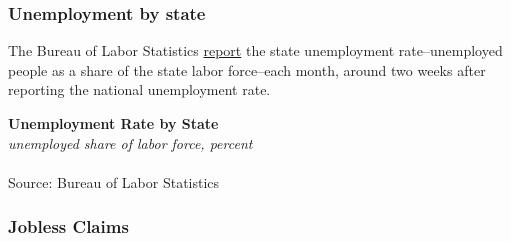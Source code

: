 \documentclass{report}
\begin{document}
{{\begin{minipage}{0.76\textwidth}
\subsubsection*{\color{black!70} \seriffont Unemployment by state}
\small The Bureau of Labor Statistics \href{https://www.bls.gov/lau/}{report} the state unemployment rate--unemployed people as a share of the state labor force--each month, around two weeks after reporting the national unemployment rate. 
\vspace{1mm}

\normalsize \textbf{Unemployment Rate by State}\\
\footnotesize{\textit{unemployed share of labor force, percent}}\\
\hspace{-8mm}  \\
\footnotesize{Source: Bureau of Labor Statistics}
\end{minipage}
\newpage
\begin{minipage}{0.76\textwidth}
\subsubsection*{\color{black!70} \seriffont Jobless Claims}
\small 


\end{minipage}
\vspace{1mm}

}}
\end{document}
